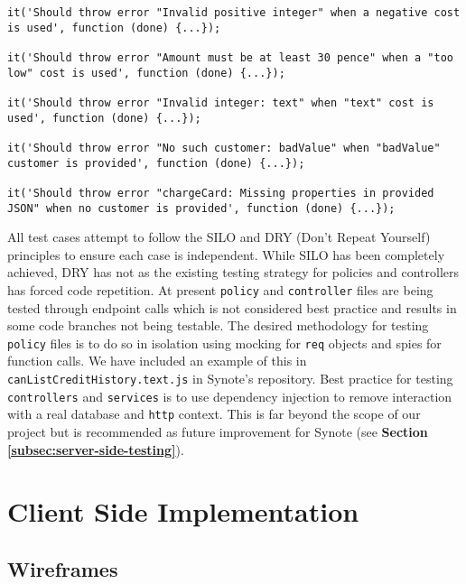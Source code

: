 \begin{listing}[H]
\begin{verbatim}
it('Should throw error "Invalid positive integer" when a negative cost is used', function (done) {...});

it('Should throw error "Amount must be at least 30 pence" when a "too low" cost is used', function (done) {...});

it('Should throw error "Invalid integer: text" when "text" cost is used', function (done) {...});

it('Should throw error "No such customer: badValue" when "badValue" customer is provided', function (done) {...});

it('Should throw error "chargeCard: Missing properties in provided JSON" when no customer is provided', function (done) {...});

\end{verbatim}
\label{lst:stripe-test-cases}
\end{listing}

All test cases attempt to follow the SILO and DRY (Don't Repeat Yourself) principles to ensure each case is independent. While SILO has been completely achieved, DRY has not as the existing testing strategy for policies and controllers has forced code repetition. At present \texttt{policy} and \texttt{controller} files are being tested through endpoint calls which is not considered best practice and results in some code branches not being testable. The desired methodology for testing \texttt{policy} files is to do so in isolation using mocking for \texttt{req} objects and spies for function calls. We have included an example of this in \texttt{canListCreditHistory.text.js} in Synote's repository. Best practice for testing \texttt{controllers} and \texttt{services} is to use dependency injection to remove interaction with a real database and \texttt{http} context. This is far beyond the scope of our project but is recommended as future improvement for Synote (see \textbf{Section \ref{subsec:server-side-testing}}).

\section{Client Side Implementation}
\label{sec:client-side-implementation}

\subsection{Wireframes}
\label{subsec:wireframes}

